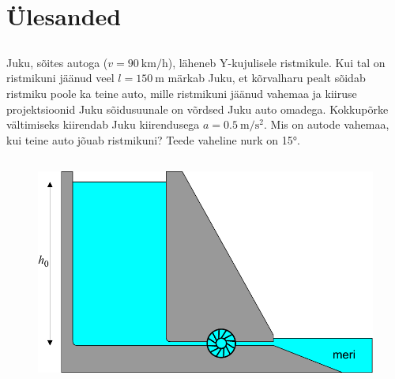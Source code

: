 \documentclass[10pt]{article}
\begin{document}
        \section{Ülesanded}
        \toggleStatement
        \subsection{\protect{}}

\graphicspath{{../probs_b3/}}


Juku, sõites autoga ($v = \SI{90}{\kilo\meter\per\hour}$), läheneb Y-kujulisele ristmikule. Kui tal on ristmikuni jäänud veel $l = \SI{150}{\meter}$ märkab Juku, et kõrvalharu pealt sõidab ristmiku poole ka teine auto, mille ristmikuni jäänud vahemaa ja kiiruse projektsioonid Juku sõidusuunale on võrdsed Juku auto omadega. Kokkupõrke vältimiseks kiirendab Juku kiirendusega $a = \SI{0.5}{\meter\per\second\squared}$. Mis on autode vahemaa, kui teine auto jõuab ristmikuni? Teede vaheline nurk on \ang{15}.
\probend
\bigskip
\newpage\subsection{\protect{}}


\begin{figure}
    \vspace{-10pt}
	\includegraphics[width=\linewidth]{2019-lahg-02-yl.pdf}
\end{figure}
\end{document}
